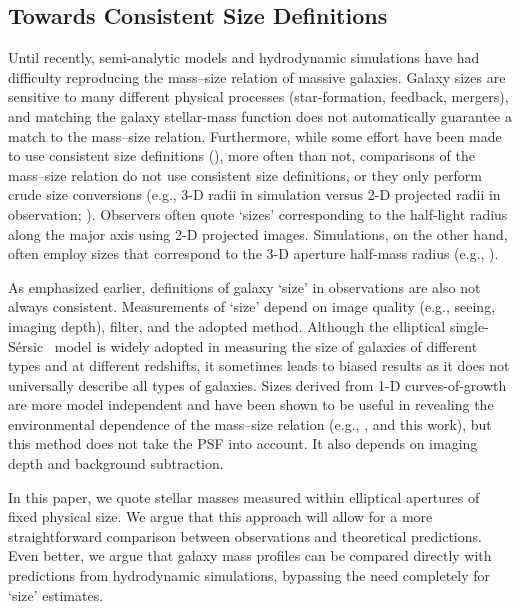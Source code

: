 \documentclass[a4paper,fleqn,usenatbib]{mnras}
\def\ser{{S\'{e}rsic\ }}
\begin{document}
\subsection{Towards Consistent Size Definitions}
        
    Until recently, semi-analytic models and hydrodynamic simulations have had
    difficulty reproducing the mass--size relation of massive galaxies. 
    Galaxy sizes are sensitive to many different physical processes (star-formation, 
    feedback, mergers), and matching the galaxy stellar-mass function does not 
    automatically guarantee a match to the mass--size relation. 
    Furthermore, while some effort have been made to use consistent size definitions 
    (\citealt{McCarthy2017}), more often than not, comparisons of the mass--size relation 
    do not use consistent size definitions, or they only perform crude size conversions 
    (e.g., 3-D radii in simulation versus 2-D projected radii in observation; 
    \citealt{Genel2017}). 
    Observers often quote `sizes' corresponding to the half-light radius along the 
    major axis using 2-D projected images. 
    Simulations, on the other hand, often employ sizes that correspond to the 3-D 
    aperture half-mass radius (e.g., \citealt{Price2017}). 
    
    As emphasized earlier, definitions of galaxy `size' in observations are also not 
    always consistent. 
    Measurements of `size' depend on image quality (e.g., seeing, imaging depth), filter, 
    and the adopted method. 
    Although the elliptical single-\ser{} model is widely adopted in measuring the 
    size of galaxies of different types and at different redshifts, it sometimes leads
    to biased results as it does not universally describe all types of galaxies. 
    Sizes derived from 1-D curves-of-growth are more model independent and have been 
    shown to be useful in revealing the environmental dependence of the mass--size 
    relation (e.g., \citealt{Yoon2017}, and this work), but this method does not take 
    the PSF into account. 
    It also depends on imaging depth and background subtraction.

    In this paper, we quote stellar masses measured within elliptical apertures of 
    fixed physical size. 
    We argue that this approach will allow for a more straightforward comparison 
    between observations and theoretical predictions. 
    Even better, we argue that galaxy mass profiles can be compared directly with 
    predictions from hydrodynamic simulations, bypassing the need completely for 
    `size' estimates.
          
\end{document}
